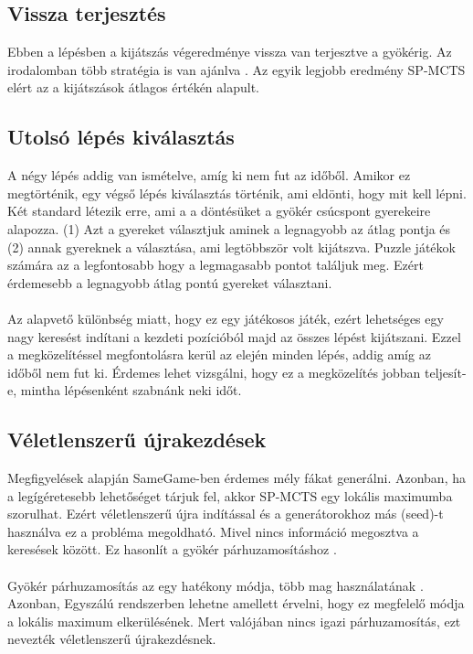 \documentclass{article}
\begin{document}
	\subsection{Vissza terjesztés}
	
	Ebben a lépésben a kijátszás végeredménye vissza van terjesztve a gyökérig. Az irodalomban több stratégia is van ajánlva\cite{coulom2006efficient} \cite{chaslot2006monte}. Az egyik legjobb eredmény SP-MCTS elért az a kijátszások átlagos értékén alapult.
	\\
	\subsection{Utolsó lépés kiválasztás}
	
	A négy lépés addig van ismételve, amíg ki nem fut az időből. Amikor ez megtörténik, egy végső lépés kiválasztás történik, ami eldönti, hogy mit kell lépni. Két standard létezik erre, ami a a döntésüket a gyökér csúcspont gyerekeire alapozza. (1) Azt a gyereket választjuk aminek a legnagyobb az átlag pontja és (2) annak gyereknek a választása, ami legtöbbször volt kijátszva. Puzzle játékok számára az a legfontosabb hogy a legmagasabb pontot találjuk meg. Ezért érdemesebb a legnagyobb átlag pontú gyereket választani.
	\\
	\\
	Az alapvető különbség miatt, hogy ez egy játékosos játék, ezért lehetséges egy nagy keresést indítani a kezdeti pozícióból majd az összes lépést kijátszani. Ezzel a megközelítéssel megfontolásra kerül az elején minden lépés, addig amíg az időből nem fut ki. Érdemes lehet vizsgálni, hogy ez a megközelítés jobban teljesít-e, mintha lépésenként szabnánk neki időt.
	\\
	\subsection{Véletlenszerű újrakezdések}
	
	Megfigyelések alapján \cite{schadd2012single} SameGame-ben érdemes mély fákat generálni. Azonban, ha a legígéretesebb lehetőséget tárjuk fel, akkor SP-MCTS egy lokális maximumba szorulhat. Ezért véletlenszerű újra indítással és a generátorokhoz más (seed)-t használva ez a probléma megoldható. Mivel nincs információ megosztva a keresések között. Ez hasonlít a gyökér párhuzamosításhoz \cite{chaslot2008parallel}.
	\\
	\\
	Gyökér párhuzamosítás az egy hatékony módja, több mag használatának \cite{chaslot2008parallel}. Azonban, Egyszálú rendszerben lehetne amellett érvelni, hogy ez megfelelő módja a lokális maximum elkerülésének. Mert valójában nincs igazi párhuzamosítás, ezt nevezték véletlenszerű újrakezdésnek.
	
\end{document}

